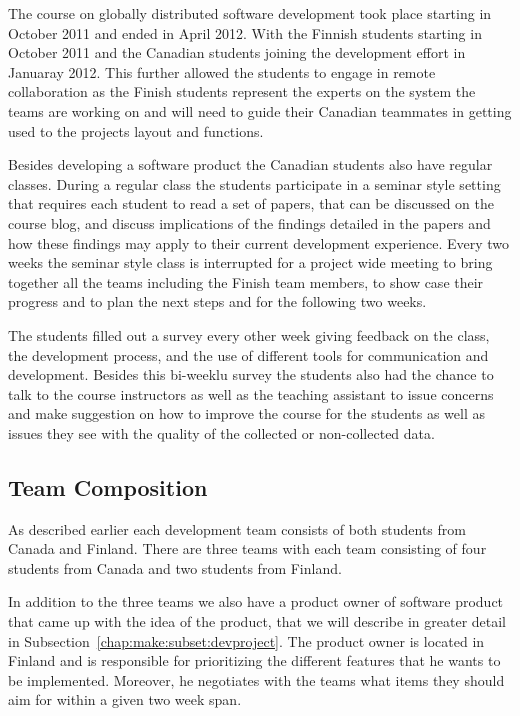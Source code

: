 The course on globally distributed software development took place starting in October 2011 and ended in April 2012.
With the Finnish students starting in October 2011 and the Canadian students joining the development effort in Januaray 2012.
This further allowed the students to engage in remote collaboration as the Finish students represent the experts on the system the teams are working on and will need to guide their Canadian teammates in getting used to the projects layout and functions.

Besides developing a software product the Canadian students also have regular classes.
During a regular class the students participate in a seminar style setting that requires each student to read a set of papers, that can be discussed on the course blog, and discuss implications of the findings detailed in the papers and how these findings may apply to their current development experience.
Every two weeks the seminar style class is interrupted for a project wide meeting to bring together all the teams including the Finish team members, to show case their progress and to plan the next steps and for the following two weeks.

The students filled out a survey every other week giving feedback on the class, the development process, and the use of different tools for communication and development.
Besides this bi-weeklu survey the students also had the chance to talk to the course instructors as well as the teaching assistant to issue concerns and make suggestion on how to improve the course for the students as well as issues they see with the quality of the collected or non-collected data.

\subsection{Team Composition}
As described earlier each development team consists of both students from Canada and Finland.
There are three teams with each team consisting of four students from Canada and two students from Finland.

In addition to the three teams we also have a product owner of software product that came up with the idea of the product, that we will describe in greater detail in Subsection~\ref{chap:make:subset:devproject}.
The product owner is located in Finland and is responsible for prioritizing the different features that he wants to be implemented.
Moreover, he negotiates with the teams what items they should aim for within a given two week span. 

